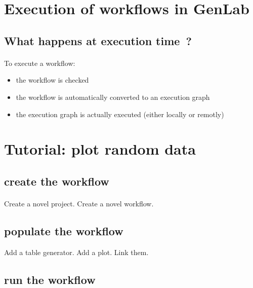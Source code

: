 \documentclass[a4paper,10pt]{book}
\begin{document}
\section{Execution of workflows in GenLab}

\subsection{What happens at execution time~?}

\paragraph*{}
To execute a workflow:
\begin{itemize}
\item the workflow is checked
\item the workflow is automatically converted to an execution graph
\item the execution graph is actually executed (either locally or remotly)
\end{itemize}

\paragraph*{}


\section{Tutorial: plot random data}

\subsection{create the workflow}

\paragraph*{}
Create a novel project.
Create a novel workflow.

\subsection{populate the workflow}

Add a table generator.
Add a plot.
Link them.

\subsection{run the workflow}
\end{document}
